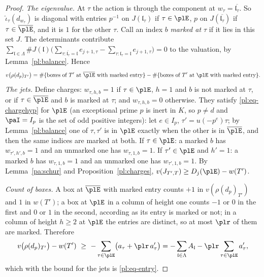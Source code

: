 \documentclass[10pt]{amsart}
\theoremstyle{definition}
\theoremstyle{remark}
\providecommand{\aubar}[1]{\overline{#1}}
\begin{document}
\begin{proof}
\emph{The eigenvalue.} At $\tau$ the action is through the component at $w_\tau=\aubar{\mathfrak
l_\tau}$. So $\hat\iota_\tau(d_{w_\tau})$ is diagonal with entries $p^{-1}$ on $J(\mathfrak l_\tau)$
if $\tau\in\plE$, $p$ on $J(\aubar{\mathfrak l_\tau})$ if $\tau\in\aubar\plE$, and it is $1$ for
the other $\tau$. Call an index $b$ \emph{marked at $\tau$} if it lies in this set $J$. The
determinants contribute $\sum_{\mathfrak l\in\Lambda}\#J(\mathfrak l)\bigl(\sum_{\tau:\aubar{
\mathfrak l_\tau}=\mathfrak l}e_{j+1,\tau}-\sum_{\tau:\mathfrak l_\tau=\mathfrak l}e_{j+1,\tau}
\bigr)=0$ to the valuation, by Lemma~\ref{pl:balance}. Hence
\[
v\bigl(\rho(d_p)_{T'}\bigr)=\#\{\text{boxes of }T'\text{ at }\aubar\plE\text{ with marked entry}\}-
\#\{\text{boxes of }T'\text{ at }\plE\text{ with marked entry}\}.
\]
\emph{The jets.} Define charges: $w_{\tau,h,b}=1$ if $\tau\in\plE$, $h=1$ and $b$ is not marked at
$\tau$, or if $\tau\in\aubar\plE$ and $b$ is marked at $\tau$; and $w_{\tau,h,b}=0$ otherwise.
They satisfy \eqref{pl:eq-chargehyp} for $\plE$ (an exceptional prime $p$ is inert in $K$, so
$p\ne d$ and $\paI=I_p$ is the set of odd positive integers): let $e\in I_p$, $\tau'=u(-p^e)\tau$; by
Lemma~\ref{pl:balance} one of $\tau,\tau'$ is in $\plE$ exactly when the other is in $\aubar\plE$,
and then the same indices are marked at both. If $\tau\in\plE$: a marked $b$ has $w_{\tau',h',b}=
1$ and an unmarked one has $w_{\tau,1,b}=1$. If $\tau'\in\plE$ and $h'=1$: a marked $b$ has
$w_{\tau,1,b}=1$ and an unmarked one has $w_{\tau',1,b}=1$. By Lemma~\ref{pa:schur} and
Proposition~\ref{pl:charges}, $v(J_{T',T})\ge D_j(\plE)-w(T')$.

\emph{Count of boxes.} A box at $\aubar\plE$ with marked entry counts $+1$ in $v(\rho(d_p)_{T'})$
and $1$ in $w(T')$; a box at $\plE$ in a column of height one counts $-1$ or $0$ in the first and
$0$ or $1$ in the second, according as its entry is marked or not; in a column of height $h\ge2$
at $\plE$ the entries are distinct, so at most $\plr$ of them are marked. Therefore
\[
v\bigl(\rho(d_p)_{T'}\bigr)-w(T')\ \ge\ -\sum_{\tau\in\plE}\bigl(a_\tau+\plr\,a'_\tau\bigr)=-\sum_{
\mathfrak l\in\Lambda}A_{\mathfrak l}-\plr\sum_{\tau\in\plE}a'_\tau ,
\]
which with the bound for the jets is \eqref{pl:eq-entry}.
\end{proof}
\end{document}
